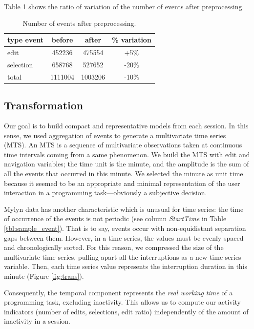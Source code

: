 \documentclass[times]{smrauth}
\begin{document}
 Table \ref{tbl:mass_events} shows the ratio of variation of the number of events after preprocessing.
 
 \begin{table}[hb!]
 \renewcommand{\arraystretch}{1.3}
 \caption{Number of events after preprocessing.}
 \label{tbl:mass_events}
 \centering
 \begin{tabular}{l | c | c | c } 
   type event & before & after & \% variation  \\  
   \hline 
   edit &	 452236 & 475554 &	+5\%   \\
   selection &	658768 & 527652 & -20\%   \\
   \hline
   total & 1111004 & 1003206 & -10\%  \\
 \end{tabular}
 \end{table}

\subsection{Transformation}
Our goal is to build compact and representative models from each session. In this sense, we used aggregation of events to generate a multivariate time series (MTS). An MTS is a sequence of multivariate observations taken at continuous time intervals coming from a same phenomenon. We build the MTS with edit and navigation variables; the time unit is the minute, and the amplitude is the sum of all the events that occurred in this minute. We selected the minute as unit time because it seemed to be an appropriate and minimal representation of the user interaction in a programming task---obviously a subjective decision. 


Mylyn data has another characteristic which is unusual for time series: the time of occurrence of the events is not periodic (see column \textit{StartTime} in Table \ref{tbl:sample_event}). That is to say, events occur with non-equidistant separation gaps between them. However, in a time series, the values must be evenly spaced and chronologically sorted. For this reason, we compressed the size of the multivariate time series, pulling apart all the interruptions as a new time series variable. Then, each time series value represents the interruption duration in this minute (Figure \ref{fig:trans}). 


Consequently, the temporal component represents the \textit{real working time} of a programming task, excluding inactivity. This allows us to compute our activity indicators (number of edits, selections, edit ratio) independently of the amount of inactivity in a session.
\end{document}
